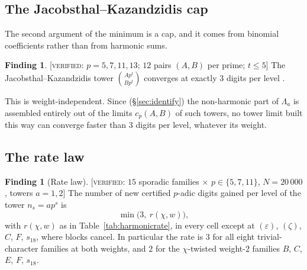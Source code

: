 \documentclass[11pt,reqno]{article}
\newcommand{\bin}[2]{\binom{#1}{#2}}
\newcommand{\VER}[1]{{\normalfont\textsc{[verified:} #1\textsc{]}}}
\theoremstyle{plain}
\theoremstyle{definition}
\newtheorem{finding}[theorem]{Finding}
\theoremstyle{remark}
\numberwithin{equation}{section}
\begin{document}
\subsection{The Jacobsthal--Kazandzidis cap}\label{ss:cap}

The second argument of the minimum is a cap, and it comes from binomial
coefficients rather than from harmonic sums.

\begin{finding}\label{find:kazrate}
\VER{$p=5,7,11,13$; $12$ pairs $(A,B)$ per prime; $t\le5$} The
Jacobsthal--Kazandzidis tower $\bin{Ap^t}{Bp^t}$ converges at exactly $3$
digits per level \cite{JacobsthalKazandzidis}.
\end{finding}

This is weight-independent.  Since (\S\ref{sec:identify}) the non-harmonic part
of $\Lambda_a$ is assembled entirely out of the limits $c_p(A,B)$ of such
towers, no tower limit built this way can converge faster than $3$ digits per
level, whatever its weight.

\subsection{The rate law}\label{ss:ratelaw}

\begin{finding}[Rate law]\label{find:ratelaw}
\VER{$15$ sporadic families $\times$ $p\in\{5,7,11\}$, $N=20\,000$, towers
$a=1,2$} The number of new certified $p$-adic digits gained per level of the
tower $n_s=ap^s$ is
\[
  \min\bigl(3,\ r(\chi,w)\bigr),
\]
with $r(\chi,w)$ as in Table~\ref{tab:harmonicrate}, in every cell except at
$(\varepsilon)$, $(\zeta)$, $C$, $F$, $s_{18}$, where
blocks cancel.  In particular the rate is $3$ for all eight trivial-character
families at both weights, and $2$ for the $\chi$-twisted weight-$2$ families
$B$, $C$, $E$, $F$, $s_{18}$.
\end{finding}
\end{document}
